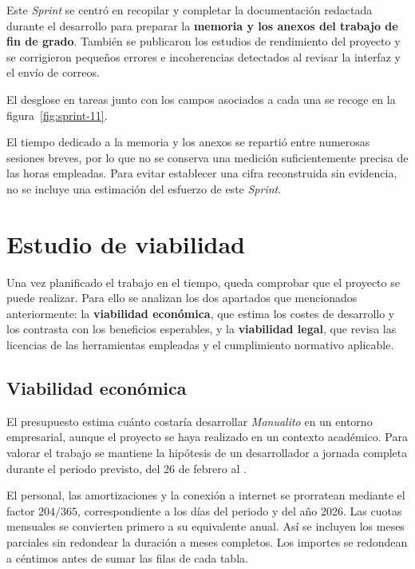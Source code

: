 Este \textit{Sprint} se centró en recopilar y completar la documentación
redactada durante el desarrollo para preparar la \textbf{memoria y los anexos
del trabajo de fin de grado}. También se publicaron los estudios de rendimiento
del proyecto y se corrigieron pequeños errores e incoherencias detectados al
revisar la interfaz y el envío de correos.

El desglose en tareas junto con los campos asociados a cada una se
recoge en la figura~\ref{fig:sprint-11}.


El tiempo dedicado a la memoria y los anexos se repartió entre numerosas sesiones
breves, por lo que no se conserva una medición suficientemente precisa de las
horas empleadas. Para evitar establecer una cifra reconstruida sin evidencia,
no se incluye una estimación del esfuerzo de este \textit{Sprint}.

\section{Estudio de viabilidad}

Una vez planificado el trabajo en el tiempo, queda comprobar que el proyecto
se puede realizar. Para ello se analizan los dos apartados que mencionados
anteriormente: la \textbf{viabilidad económica}, que estima los costes de
desarrollo y los contrasta con los beneficios esperables, y la \textbf{viabilidad
legal}, que revisa las licencias de las herramientas empleadas y el cumplimiento
normativo aplicable.

\subsection{Viabilidad económica}
El presupuesto estima cuánto costaría desarrollar \textit{Manualito} en un
entorno empresarial, aunque el proyecto se haya realizado en un contexto
académico. Para valorar el trabajo se mantiene la hipótesis de un
desarrollador a jornada completa durante el periodo previsto, del 26 de
febrero al \fechaEntrega.

El personal, las amortizaciones y la conexión a internet se prorratean mediante el factor
\(\num{204}/\num{365}\), correspondiente a los días del periodo y del año
2026. Las cuotas mensuales se convierten primero a su equivalente anual.
Así se incluyen los meses parciales sin redondear la duración a meses
completos. Los importes se redondean a céntimos antes de sumar las filas de
cada tabla.


